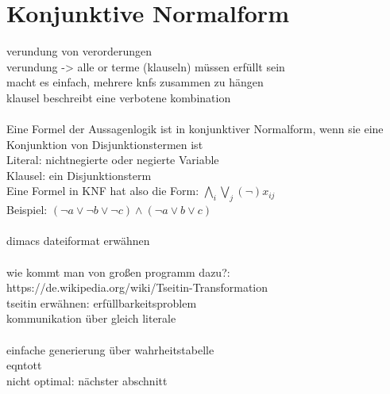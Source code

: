 \section{Konjunktive Normalform}
\label{sec:knf}


verundung von verorderungen\\
verundung -> alle or terme (klauseln) müssen erfüllt sein\\
macht es einfach, mehrere knfs zusammen zu hängen\\
klausel beschreibt eine verbotene kombination\\
~\\
Eine Formel der Aussagenlogik ist in konjunktiver Normalform, wenn sie eine Konjunktion von Disjunktionstermen ist\\
Literal: nichtnegierte oder negierte Variable\\
Klausel: ein Disjunktionsterm\\
Eine Formel in KNF hat also die Form: \newline \newline $ \bigwedge\limits_{i} \bigvee\limits_{j} (\neg)x_{ij} $\\
Beispiel: $ (\neg a \vee \neg b \vee \neg c) \wedge (\neg a \vee b \vee c) $\\
~\\
dimacs dateiformat erwähnen\\
~\\
wie kommt man von großen programm dazu?:\\
https://de.wikipedia.org/wiki/Tseitin-Transformation\\
tseitin erwähnen: erfüllbarkeitsproblem\\
kommunikation über gleich literale\\
~\\
einfache generierung über wahrheitstabelle\\
eqntott\\
nicht optimal: nächster abschnitt